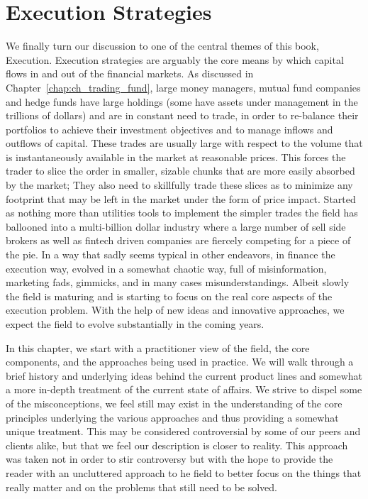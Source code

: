 \chapter{Execution Strategies\label{chap:ch_exec_models}}

We finally turn our discussion to one of the central themes of this book, Execution. Execution strategies are arguably the core means by which capital flows in and out of the financial markets.  As discussed in Chapter~\ref{chap:ch_trading_fund}, large money managers, mutual fund companies and hedge funds have large holdings (some have assets under management in the trillions of dollars) and are in constant need to trade, in order to re-balance their portfolios to achieve their investment objectives and to manage inflows and outflows of capital. These trades are usually large with respect to the volume that is instantaneously available in the market at reasonable prices. This forces the trader to slice the order in smaller, sizable chunks that are more easily absorbed by the market; They also need to skillfully trade these slices as to minimize any footprint that may be left in the market under the form of price impact. Started as nothing more than utilities tools to implement the simpler trades the field has ballooned into a multi-billion dollar industry where a large number of sell side brokers as well as fintech driven companies are fiercely competing for a piece of the pie. In a way that sadly seems typical in other endeavors, in finance the execution way, evolved in a somewhat chaotic way, full of misinformation, marketing fads, gimmicks, and in many cases misunderstandings. Albeit slowly the field is maturing and is starting to focus on the real core aspects of the execution problem. With the help of new ideas and innovative approaches, we expect the field to evolve substantially in the coming years.


In this chapter, we start with a practitioner view of the field, the core components, and the approaches being used in practice. We will walk through a brief history and underlying ideas behind the current product lines and somewhat a more in-depth treatment of the current state of affairs. We strive to dispel some of the misconceptions, we feel still may exist in the understanding of the core principles underlying the various approaches and thus providing a somewhat unique treatment. This may be considered controversial by some of our peers and clients alike, but that we feel our description is closer to reality. This approach was taken not in order to stir controversy but  with the hope to provide the reader with an uncluttered approach to he field  to better focus on the things that really matter and on the problems that still need to be solved.


